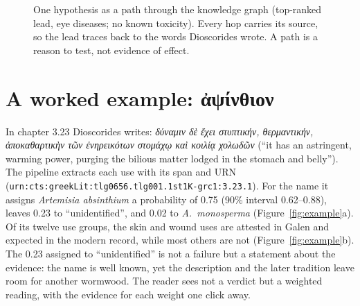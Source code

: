 \documentclass[11pt,a4paper]{article}
\newcommand{\grc}[1]{#1}
\begin{document}
\begin{figure}[t]
\centering
{}
\caption{One hypothesis as a path through the knowledge graph (top-ranked lead, eye diseases; no known toxicity). Every hop carries its source, so the lead traces back to the words Dioscorides wrote. A path is a reason to test, not evidence of effect.}
\label{fig:path}
\end{figure}

\section{A worked example: \grc{ἀψίνθιον}}

In chapter 3.23 Dioscorides writes: \textit{\grc{δύναμιν δὲ ἔχει στυπτικήν, θερμαντικήν, ἀποκαθαρτικὴν τῶν ἐνηρεικότων στομάχῳ καὶ κοιλίᾳ χολωδῶν}} (“it has an astringent, warming power, purging the bilious matter lodged in the stomach and belly”). The pipeline extracts each use with its span and URN (\nolinkurl{urn:cts:greekLit:tlg0656.tlg001.1st1K-grc1:3.23.1}). For the name it assigns \textit{Artemisia absinthium} a probability of 0.75 (90\% interval 0.62–0.88), leaves 0.23 to “unidentified”, and 0.02 to \textit{A.\ monosperma} (Figure~\ref{fig:example}a). Of its twelve use groups, the skin and wound uses are attested in Galen and expected in the modern record, while most others are not (Figure~\ref{fig:example}b). The 0.23 assigned to “unidentified” is not a failure but a statement about the evidence: the name is well known, yet the description and the later tradition leave room for another wormwood. The reader sees not a verdict but a weighted reading, with the evidence for each weight one click away.
\end{document}
